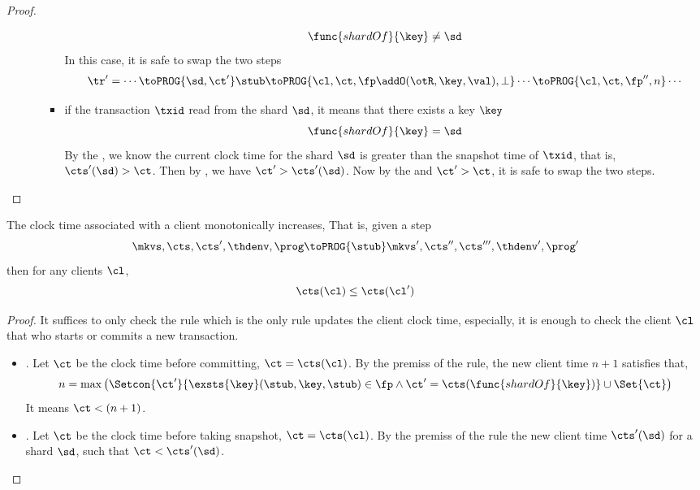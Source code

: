 \begin{proof}
\begin{itemize}
\begin{itemize}
\begin{itemize}
                \[
                    \func{shardOf}{\key} \neq \sd
                \]
            In this case, it is safe to swap the two steps
            \[
            \begin{array}{@{}l@{}}
            \tr' = \cdots \toPROG{\sd, \ct'} \stub \toPROG{\cl,\ct,\fp \addO (\otR, \key, \val),\perp} \cdots \toPROG{\cl,\ct,\fp'',n} \cdots \\
            \end{array}
            \]
            \item if the transaction \( \txid \) read from the shard \( \sd \), it means that there exists a key \( \key \)
            \[
                \func{shardOf}{\key} = \sd
            \]
            By the , we know the current clock time for the shard \( \sd \) is greater than the snapshot time of \( \txid \), 
            that is, \( \cts'(\sd) > \ct \).
            Then by ,  we have \( \ct' > \cts'(\sd) \).
            Now by the  and \( \ct' > \ct \), it is safe to swap the two steps.
        \end{itemize}
    \end{itemize}
    \end{itemize}
\end{proof}

\begin{lemma}
    \label{lem:mono-client-clock-time}
    The clock time associated with a client monotonically increases,
    That is, given a step
    \[
        \mkvs, \cts, \cts', \thdenv, \prog \toPROG{\stub} \mkvs', \cts'', \cts''', \thdenv', \prog'
    \]
    then for any clients \( \cl \),
    \[
        \cts(\cl) \leq \cts(\cl')
    \]
\end{lemma}
\begin{proof}
    It suffices to only check the  rule which is the only rule updates the client clock time,
    especially, it is enough to check the client \( \cl \) that who starts or commits a new transaction.
    \begin{itemize}
        \item {}.
            Let \( \ct \) be the clock time before committing, \( \ct = \cts(\cl)\).
            By the premiss of the rule, the new client time \( n + 1 \) satisfies that, 
            \[
                n = \max\left( \Setcon{\ct'}{\exsts{\key} (\stub, \key, \stub) \in \fp \land \ct' = \cts(\func{shardOf}{\key})} \cup \Set{\ct} \right)
            \]
            It means \( \ct < (n + 1)\).
        \item {}.
            Let \( \ct \) be the clock time before taking snapshot, \( \ct = \cts(\cl)\).
            By the premiss of the rule the new  client time \( \cts'(\sd) \) for a shard \( \sd \), 
            such that \( \ct < \cts'(\sd)  \).
    \end{itemize}
\end{proof}

